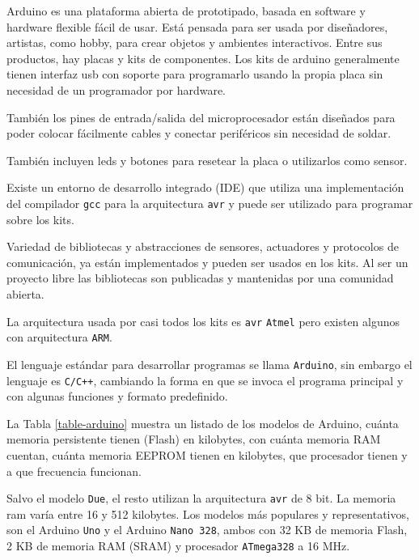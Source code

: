 
  Arduino es una plataforma abierta de prototipado, basada en
software y hardware flexible fácil de usar.
  Está pensada para ser usada por diseñadores, artistas, como
hobby, para crear objetos y ambientes interactivos.
  Entre sus productos, hay placas y kits de componentes.
  Los kits de arduino generalmente tienen interfaz usb con soporte
para programarlo usando la propia placa sin necesidad de un
programador por hardware.

  También los pines de entrada/salida del microprocesador
están diseñados para poder colocar fácilmente cables y
conectar periféricos sin necesidad de soldar.

  También incluyen leds y botones para resetear la placa o
utilizarlos como sensor.

  Existe un entorno de desarrollo integrado (IDE) que utiliza
una implementación del compilador \texttt{gcc} para la arquitectura
\texttt{avr} y puede ser utilizado para programar sobre los kits.

  Variedad de bibliotecas y abstracciones de sensores, actuadores y
protocolos de comunicación, ya están implementados y pueden ser
usados en los kits.
  Al ser un proyecto libre las bibliotecas son publicadas y mantenidas
por una comunidad abierta.

  La arquitectura usada por casi todos los kits
es \texttt{avr} \texttt{Atmel} pero existen algunos con
arquitectura \texttt{ARM}.

  El lenguaje estándar para desarrollar programas se llama \texttt{Arduino},
sin embargo el lenguaje es \texttt{C/C++}, cambiando la forma en que
se invoca el programa principal y con algunas funciones y
formato predefinido.

  La Tabla \ref{table-arduino} muestra un listado de los modelos
de Arduino, cuánta memoria persistente tienen (Flash) en kilobytes, con
cuánta memoria RAM cuentan, cuánta memoria EEPROM tienen en kilobytes,
que procesador tienen y a que frecuencia funcionan.

  Salvo el modelo \texttt{Due}, el resto utilizan la
arquitectura \texttt{avr} de 8 bit. La memoria ram varía entre
16 y 512 kilobytes.
  Los modelos más populares y representativos, son el Arduino \texttt{Uno}
y el Arduino \texttt{Nano 328}, ambos con 32 KB de memoria Flash, 2 KB de memoria
RAM (SRAM) y procesador \texttt{ATmega328} a 16 MHz.

